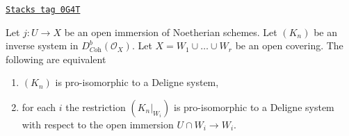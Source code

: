 \begin{lemma}
\label{duality-lemma-characterize-extension-by-zero}
\href{https://stacks.math.columbia.edu/tag/0G4T}{\texttt{Stacks tag 0G4T}}

Let $j : U \to X$ be an open immersion of Noetherian schemes. Let
$(K_n)$ be an inverse system in $D^b_{\textit{Coh}}(\mathcal{O}_X)$.
Let $X = W_1 \cup \ldots \cup W_r$ be an open covering.
The following are equivalent
\begin{enumerate}
\item $(K_n)$ is pro-isomorphic to a Deligne system,
\item for each $i$ the restriction $(K_n|_{W_i})$
is pro-isomorphic to a Deligne system with respect to
the open immersion $U \cap W_i \to W_i$.
\end{enumerate}
\end{lemma}

